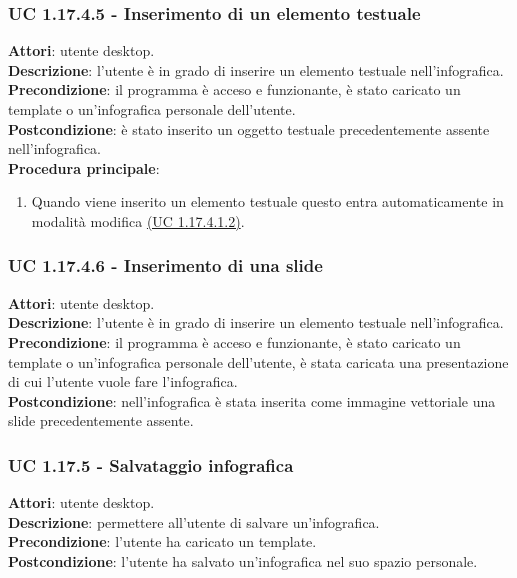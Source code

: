 {\subsubsection{UC 1.17.4.5 - Inserimento di un elemento testuale}{
	\label{uc1.17.4.5}
	\textbf{Attori}: utente desktop. \\
	\textbf{Descrizione}: l'utente è in grado di inserire un elemento testuale nell'infografica. \\
	\textbf{Precondizione}: il programma è acceso e funzionante, è stato caricato un template o un'infografica personale dell'utente.	\\
	\textbf{Postcondizione}: è stato inserito un oggetto testuale precedentemente assente nell'infografica.	\\
	\textbf{Procedura principale}:
	\begin{enumerate}
		\item Quando viene inserito un elemento testuale questo entra automaticamente in modalità modifica \hyperref[uc1.17.4.1.2]{(UC 1.17.4.1.2)}.
	\end{enumerate}
	}
\subsubsection{UC 1.17.4.6 - Inserimento di una slide}{
	\label{uc1.17.4.6}
	\textbf{Attori}: utente desktop. \\
	\textbf{Descrizione}: l'utente è in grado di inserire un elemento testuale nell'infografica. \\
	\textbf{Precondizione}: il programma è acceso e funzionante, è stato caricato un template o un'infografica personale dell'utente, è stata caricata una presentazione di cui l'utente vuole fare l'infografica.	\\
	\textbf{Postcondizione}: nell'infografica è stata inserita come immagine vettoriale una slide precedentemente assente.	\\
	}
\subsubsection{UC 1.17.5 - Salvataggio infografica}{
	\label{uc1.17.5}
	\textbf{Attori}: utente desktop. \\
	\textbf{Descrizione}: permettere all’utente di salvare un’infografica. \\
	\textbf{Precondizione}: l'utente ha caricato un template.	\\
	\textbf{Postcondizione}: l'utente ha salvato un’infografica nel suo spazio personale.	\\
	}
}
